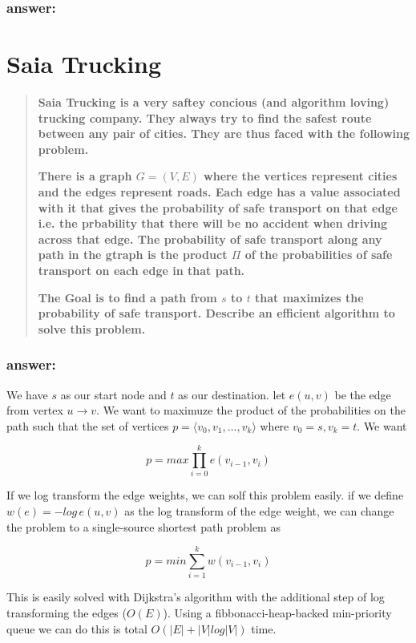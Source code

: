 \documentclass[titlepage]{article}\usepackage[]{graphicx}\usepackage[]{color}
\theoremstyle{definition}
\begin{document}
\subsubsection{answer:}
\vspace{5cm}

\section{Saia Trucking}
\begin{quote}
  \textbf{Saia Trucking is a very saftey concious (and algorithm loving)
  trucking company. They always try to find the safest route between any pair
of cities. They are thus faced with the following problem.}

\textbf{There is a graph $G = (V,E)$ where the vertices represent cities and the edges
represent roads. Each edge has a value associated with it that gives the
probability of safe transport on that edge i.e. the prbability that there will
be no accident when driving across that edge. The probability of safe transport
along any path in the gtraph is the product $\Pi$ of the probabilities of safe
transport on each edge in that path.}

\textbf{The Goal is to find a path from $s$ to $t$ that maximizes the probability of
safe transport. Describe an efficient algorithm to solve this problem.  }
\end{quote}
\subsubsection{answer:}
We have $s$ as our start node and $t$ as our destination. let $e(u,v)$ be the
edge from vertex $u \rightarrow v$. We want to maximuze the product of the
probabilities on the path such that the set of vertices $p = \langle v_0, v_1,
\dots, v_k \rangle$ where $v_0 = s, v_k = t$. We want

\[ p = max \prod_{i = 0}^{k} e(v_{i-1}, v_i) \]

If we log transform the edge weights, we can solf this problem easily. if we
define $w(e) = - log \, e(u,v)$ as the log transform of the edge weight, we can
change the problem to  a single-source shortest path problem as 

\[ p = min \sum_{i=1}^{k} w(v_{i-1}, v_i) \]

This is easily solved with Dijkstra's algorithm with the additional step of log
transforming the edges ($O(E)$). Using a fibbonacci-heap-backed min-priority
queue we can do this is total $O(|E| + |V| log |V|)$ time.
\end{document}
